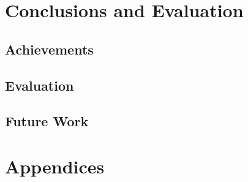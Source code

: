 \documentclass[a4paper,12pt]{report}
\begin{document}
\chapter{Conclusions and Evaluation}
\label{conc_eval_sec}
\section{Achievements}


\section{Evaluation}

\section{Future Work}
\label{future}


\appendix

\printbibliography

\chapter{Appendices}

\end{document}
